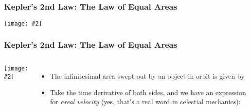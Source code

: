 \documentclass[12pt,compress,aspectratio=169]{beamer}
\newcommand{\pic}[2]{\texttt{[image: \#2]}}
\begin{document}
\begin{frame}
  \frametitle{Kepler's 2nd Law: The Law of Equal Areas}

  \vspace{0.2in}
  \begin{center}

    \pic{.6}{201532-132212364-3243-planet.jpg}
  \end{center}
\end{frame}


\begin{frame}
  \frametitle{Kepler's 2nd Law: The Law of Equal Areas}
  \begin{center}
  \end{center}

  \begin{columns}
    \pic{1.2}{kepa1.png}
    \begin{itemize}
    \item The infinitesimal area swept out by an object in orbit is given by
      
    \item Take the time derivative of both sides, and we have an expression for
      \emph{areal velocity} (yes, that's a real word in celestial mechanics):
      
    \end{itemize}
  \end{columns}
\end{frame}
\end{document}
